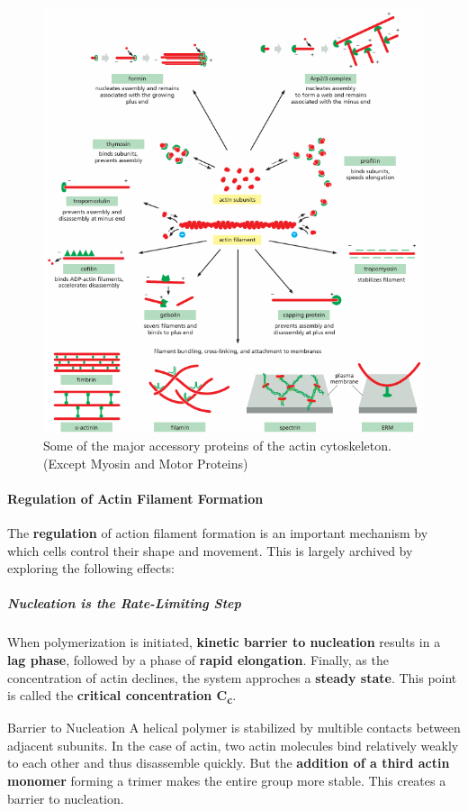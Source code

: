 \documentclass[../main.tex]{subfiles}
\begin{document}
\begin{figure}[H]
	\centering
	\includegraphics[width = 0.8 \textwidth]{16}
	\caption{Some of the major accessory proteins of the actin cytoskeleton. (Except Myosin and Motor Proteins)}
\end{figure}

\paragraph{Regulation of Actin Filament Formation}
The \textbf{regulation} of action filament formation is an important mechanism by which cells control their shape and movement. This is largely archived by exploring the following effects: 

\subparagraph{Nucleation is the Rate-Limiting Step}
\noindent When polymerization is initiated, \textbf{kinetic barrier to nucleation} results in a \textbf{lag phase}, followed by a phase of \textbf{rapid elongation}. Finally, as the concentration of actin declines, the system approches a \textbf{steady state}. This point is called the \textbf{critical concentration C\textsubscript{c}}.

\begin{RemarkWithTitel}{Barrier to Nucleation}
	A helical polymer is stabilized by multible contacts between adjacent subunits. In the case of actin, two actin molecules bind relatively weakly to each other and thus disassemble quickly. But the \textbf{addition of a third actin monomer} forming a trimer makes the entire group more stable. This creates a barrier to nucleation. 
\end{RemarkWithTitel}
\end{document}
